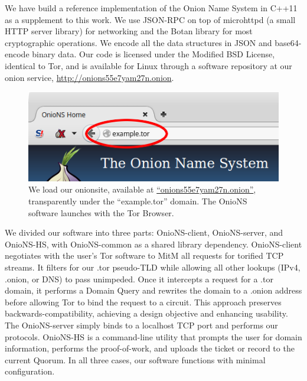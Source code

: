 \documentclass[USenglish,oneside,twocolumn]{article}
\begin{document}
We have build a reference implementation of the Onion Name System in C++11 as a supplement to this work. We use JSON-RPC on top of microhttpd \cite{microhttpd} (a small HTTP server library) for networking and the Botan \cite{BotanLib} library for most cryptographic operations. We encode all the data structures in JSON and base64-encode binary data. Our code is licensed under the Modified BSD License, identical to Tor, and is available for Linux through a software repository at our onion service, \href{http://onions55e7yam27n.onion}{http://onions55e7yam27n.onion}. %

\begin{figure}[t!]
	\centering
	\vspace{-8px}
	\includegraphics[width=0.85\linewidth]{../assets/images/example.png}
	\caption{We load our onionsite, available at \href{http://onions55e7yam27n.onion}{``onions55e7yam27n.onion''}, transparently under the ``example.tor'' domain. The OnioNS software launches with the Tor Browser.}
	\label{fig:prototypeExample}
	\vspace{-12pt}
\end{figure}

We divided our software into three parts: OnioNS-client, OnioNS-server, and OnioNS-HS, with OnioNS-common as a shared library dependency. OnioNS-client negotiates with the user's Tor software to MitM all requests for torified TCP streams. It filters for our .tor pseudo-TLD while allowing all other lookups (IPv4, .onion, or DNS) to pass unimpeded. Once it intercepts a request for a .tor domain, it performs a Domain Query and rewrites the domain to a .onion address before allowing Tor to bind the request to a circuit. This approach preserves backwards-compatibility, achieving a design objective and enhancing usability. The OnioNS-server simply binds to a localhost TCP port and performs our protocols. OnioNS-HS is a command-line utility that prompts the user for domain information, performs the proof-of-work, and uploads the ticket or record to the current Quorum. In all three cases, our software functions with minimal configuration. %
\end{document}
